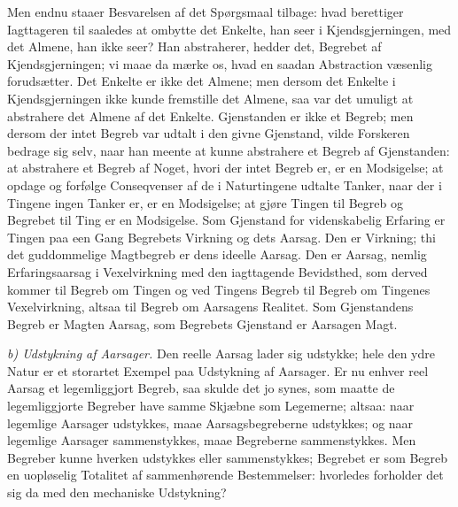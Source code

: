 \documentclass[12pt,a4paper]{book}
\newcommand{\runin}[1]{\emph{#1}\hspace{0.4em}}
\begin{document}
Men endnu staaer Besvarelsen af det Spørgsmaal tilbage: hvad berettiger
Iagttageren til saaledes at ombytte det Enkelte, han seer i
Kjendsgjerningen, med det Almene, han ikke seer? Han abstraherer, hedder
det, Begrebet af Kjendsgjerningen; vi maae da mærke os, hvad en saadan
Abstraction væsenlig forudsætter. Det Enkelte er ikke det Almene; men
dersom det Enkelte i Kjendsgjerningen ikke kunde fremstille det Almene,
saa var det umuligt at abstrahere det Almene af det Enkelte.
Gjenstanden er ikke et Begreb; men dersom der intet Begreb var udtalt i
den givne Gjenstand, vilde Forskeren bedrage sig selv, naar han meente
at kunne abstrahere et Begreb af Gjenstanden: at abstrahere et Begreb af
Noget, hvori der intet Begreb er, er en Modsigelse; at opdage og
forfølge Conseqvenser af de i Naturtingene udtalte Tanker, naar der i
Tingene ingen Tanker er, er en Modsigelse; at gjøre Tingen til Begreb og
Begrebet til Ting er en Modsigelse. Som Gjenstand for videnskabelig
Erfaring er Tingen paa een Gang Begrebets Virkning og dets Aarsag. Den
er Virkning; thi det guddommelige Magtbegreb er dens ideelle Aarsag.
Den er
Aarsag, nemlig Erfaringsaarsag i Vexelvirkning med den iagttagende
Bevidsthed, som derved kommer til Begreb om Tingen og ved Tingens Begreb
til Begreb om Tingenes Vexelvirkning, altsaa til Begreb om Aarsagens
Realitet. Som Gjenstandens Begreb er Magten Aarsag, som Begrebets
Gjenstand er Aarsagen Magt.

\runin{b) Udstykning af Aarsager.} Den reelle Aarsag lader sig
udstykke; hele den ydre Natur er et storartet Exempel paa Udstykning af
Aarsager. Er nu enhver reel Aarsag et legemliggjort Begreb, saa skulde
det jo synes, som maatte de legemliggjorte Begreber have samme Skjæbne
som Legemerne; altsaa: naar legemlige Aarsager udstykkes, maae
Aarsagsbegreberne udstykkes; og naar legemlige Aarsager sammenstykkes,
maae Begreberne sammenstykkes. Men Begreber kunne hverken udstykkes
eller sammenstykkes; Begrebet er som Begreb en uopløselig Totalitet af
sammenhørende Bestemmelser: hvorledes forholder det sig da med den
mechaniske Udstykning?
\end{document}
